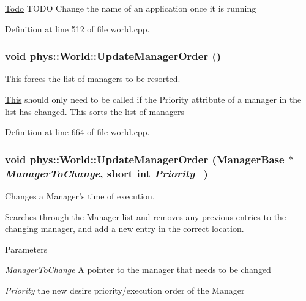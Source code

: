 \begin{Desc}
\item[\hyperlink{todo__todo000028}{Todo}]TODO Change the name of an application once it is running \end{Desc}




Definition at line 512 of file world.cpp.

\hypertarget{classphys_1_1World_ae807112b9494a94a6ff0d60df0a4d424}{
\subsubsection[{UpdateManagerOrder}]{\setlength{\rightskip}{0pt plus 5cm}void phys::World::UpdateManagerOrder ()}}
\label{da/ddf/classphys_1_1World_ae807112b9494a94a6ff0d60df0a4d424}


\hyperlink{structThis}{This} forces the list of managers to be resorted. 

\hyperlink{structThis}{This} should only need to be called if the Priority attribute of a manager in the list has changed. \hyperlink{structThis}{This} sorts the list of managers 

Definition at line 664 of file world.cpp.

\hypertarget{classphys_1_1World_abbe8ceecc6bdbd542a250fd721c05276}{
\subsubsection[{UpdateManagerOrder}]{\setlength{\rightskip}{0pt plus 5cm}void phys::World::UpdateManagerOrder ({\bf ManagerBase} $\ast$ {\em ManagerToChange}, \/  short int {\em Priority\_\-})}}
\label{da/ddf/classphys_1_1World_abbe8ceecc6bdbd542a250fd721c05276}


Changes a Manager's time of execution. 

Searches through the Manager list and removes any previous entries to the changing manager, and add a new entry in the correct location. 
\begin{DoxyParams}{Parameters}
\item[{\em ManagerToChange}]A pointer to the manager that needs to be changed \item[{\em Priority}]the new desire priority/execution order of the Manager \end{DoxyParams}


